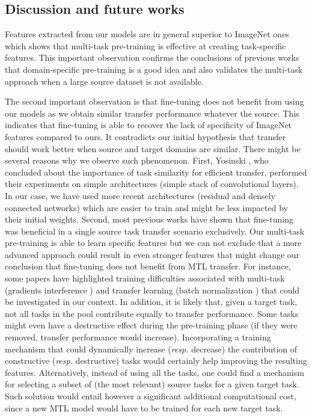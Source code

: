 \subsection{Discussion and future works}
\label{ssec:mtask:res:discussion}


Features extracted from our models are in general superior to ImageNet ones %
which shows that multi-task pre-training is effective at creating task-specific features. This important observation confirms the conclusions of previous works that domain-specific pre-training is a good idea and also validates the multi-task approach when a large source dataset is not available. 

The second important observation is that fine-tuning does not benefit from using our models as we obtain similar transfer performance whatever the source. This indicates that fine-tuning is able to recover the lack of specificity of ImageNet features compared to ours. It contradicts our initial hypothesis that transfer should work better when source and target domains are similar. There might be several reasons why we observe such phenomenon. First, Yosinski \etal \parencite{yosinski2014transferable}, who concluded about the importance of task similarity for efficient transfer, performed their experiments on simple architectures (\eg simple stack of convolutional layers). In our case, we have used more recent architectures (\ie residual and densely connected networks) which are easier to train and might be less impacted by their initial weights. Second, most previous works have shown that fine-tuning was beneficial in a single source task transfer scenario exclusively. Our multi-task pre-training is able to learn specific features but we can not exclude that a more advanced approach could result in even stronger features that might change our conclusion that fine-tuning does not benefit from MTL transfer. For instance, some papers have highlighted training difficulties associated with multi-task (\eg gradients interference \parencite{yu2020gradient}) and transfer learning (\eg batch normalization \parencite{chang2019domain}) that could be investigated in our context. In addition, it is likely that, given a target task, not all tasks in the pool contribute equally to transfer performance. Some tasks might even have a destructive effect during the pre-training phase (\ie if they were removed, transfer performance would increase). Incorporating a training mechanism that could dynamically increase (\textit{resp.} decrease) the contribution of constructive (\textit{resp.} destructive) tasks would certainly help improving the resulting features. Alternatively, instead of using all  the tasks, one could find a mechanism for selecting a subset of (the most relevant) source tasks for a given target task. Such solution would entail however a significant additional computational cost, since a new MTL model would have to be trained for each new target task.

